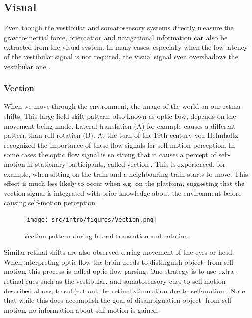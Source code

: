 \subsection{Visual}
Even though the vestibular and somatosensory systems directly measure the gravito-inertial force, orientation and navigational information can also be extracted from the visual system. In many cases, especially when the low latency of the vestibular signal is not required, the visual signal even overshadows the vestibular one \cite{wright2005,gaerlan2012}.

\subsubsection{Vection}
When we move through the environment, the image of the world on our retina shifts. This large-field shift pattern, also known as optic flow, depends on the movement being made. Lateral translation (A) for example causes a different pattern than roll rotation (B). At the turn of the 19th century von Helmholtz \citeyear{vonhelmholtz1867} recognized the importance of these flow signals for self-motion perception. In some cases the optic flow signal is so strong that it causes a percept of self-motion in stationary participants, called vection \cite{dichgans1978}. This is experienced, for example, when sitting on the train and a neighbouring train starts to move. This effect is much less likely to occur when e.g. on the platform, suggesting that the vection signal is integrated with prior knowledge about the environment before causing self-motion perception \cite{andersen1985,lepecq1995}


\begin{figure}
    \texttt{[image: src/intro/figures/Vection.png]}

    \caption{Vection pattern during  lateral translation and  rotation.}
    \label{intro:fig2}
\end{figure}

Similar retinal shifts are also observed during movement of the eyes or head. When interpreting optic flow the brain needs to distinguish object- from self-motion, this process is called optic flow parsing. One strategy is to use extra-retinal cues such as the vestibular, and somatosensory cues to self-motion described above, to subject out the retinal stimulation due to self-motion \cite{wertheim1994,wexler2001,macneilage2012}. Note that while this does accomplish the goal of disambiguation object- from self-motion, no information about self-motion is gained.

